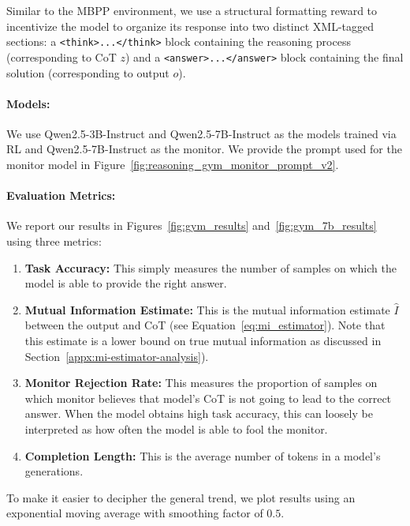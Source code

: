 \documentclass{article}
\theoremstyle{plain}
\begin{document}
Similar to the MBPP environment, we use a structural formatting reward to incentivize the model to organize its response into two distinct XML-tagged sections: a \texttt{<think>...</think>} block containing the reasoning process (corresponding to CoT $z$) and a \texttt{<answer>...</answer>} block containing the final solution (corresponding to output $o$).


\paragraph{Models:} We use Qwen2.5-3B-Instruct and Qwen2.5-7B-Instruct as the models trained via RL and Qwen2.5-7B-Instruct as the monitor. We provide the prompt used for the monitor model in Figure~\ref{fig:reasoning_gym_monitor_prompt_v2}.

\paragraph{Evaluation Metrics:} We report our results in Figures~\ref{fig:gym_results} and~\ref{fig:gym_7b_results} using three metrics:

\begin{enumerate}
    \item \textbf{Task Accuracy:} This simply measures the number of samples on which the model is able to provide the right answer.
    \item \textbf{Mutual Information Estimate:} This is the mutual information estimate $\hat I$ between the output and CoT (see Equation~\ref{eq:mi_estimator}). Note that this estimate is a lower bound on true mutual information as discussed in Section~\ref{appx:mi-estimator-analysis}).
    \item \textbf{Monitor Rejection Rate:} This measures the proportion of samples on which monitor believes that model's CoT is not going to lead to the correct answer.
    When the model obtains high task accuracy, this can loosely be interpreted as how often the model is able to fool the monitor.
    \item \textbf{Completion Length:} This is the average number of tokens in a model's generations.
\end{enumerate}

To make it easier to decipher the general trend, we plot results using an exponential moving average with smoothing factor of $0.5$.
\end{document}
